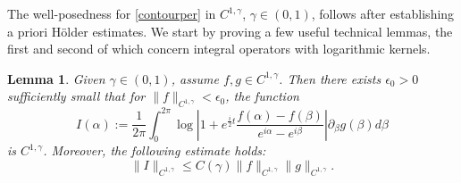 \documentclass[11pt,reqno]{amsproc}
\newtheorem{lemma}{Lemma}
\newcommand{\eps}{\epsilon}
\newcommand{\p}{\partial}
\newcommand{\pb}{\p_\beta}
\begin{document}
The well-posedness for \eqref{contourper} in $C^{1,\gamma}$, $\gamma \in (0,1)$, follows after establishing a priori H\"older estimates. We start by proving a few useful technical lemmas, the first and second of which concern integral operators with logarithmic kernels.
\begin{lemma}\label{lem:logintegral}
    Given $\gamma \in (0,1)$, assume $f, g \in C^{1,\gamma}$. Then there exists $\eps_0 > 0$ sufficiently small that for $\|f\|_{C^{1,\gamma}} < \eps_0$, the function
    \begin{equation}
        \label{eq:logintegral}
        I(\alpha) := \frac{1}{2\pi}\int_0^{2\pi} \log \left|1 + e^{\frac{i}{2}t}\frac{f(\alpha) - f(\beta)}{e^{i\alpha} - e^{i\beta}}\right| \pb g(\beta) d\beta
    \end{equation}
    is $C^{1,\gamma}$. Moreover, the following estimate holds:
    \begin{equation}
        \label{est:logintegral}
        \|I\|_{C^{1,\gamma}} \le C(\gamma)\|f\|_{C^{1,\gamma}}\|g\|_{C^{1,\gamma}}.
    \end{equation}
\end{lemma}
\end{document}
